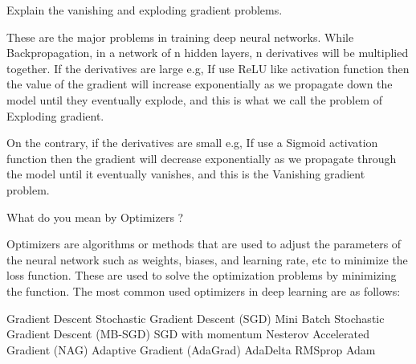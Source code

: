 \documentclass[12pt,a4paper]{exam}
\begin{document}

\question
Explain the vanishing and exploding gradient problems.
\fillwithlines{3cm}
\begin{solution}
These are the major problems in training deep neural networks.
While Backpropagation, in a network of n hidden layers, n derivatives will be multiplied together. If the derivatives are large e.g, If use ReLU like activation function then the value of the gradient will increase exponentially as we propagate down the model until they eventually explode, and this is what we call the problem of Exploding gradient.

On the contrary, if the derivatives are small e.g, If use a Sigmoid activation function then the gradient will decrease exponentially as we propagate through the model until it eventually vanishes, and this is the Vanishing gradient problem.
\end{solution}


\question
What do you mean by Optimizers ?
\fillwithlines{3cm}
\begin{solution}
Optimizers are algorithms or methods that are used to adjust the parameters of the neural network such as weights, biases, and learning rate, etc to minimize the loss function. These are used to solve the optimization problems by minimizing the function.
The most common used optimizers in deep learning are as follows:

Gradient Descent
Stochastic Gradient Descent (SGD)
Mini Batch Stochastic Gradient Descent (MB-SGD)
SGD with momentum
Nesterov Accelerated Gradient (NAG)
Adaptive Gradient (AdaGrad)
AdaDelta
RMSprop
Adam
\end{solution}

\end{document}
